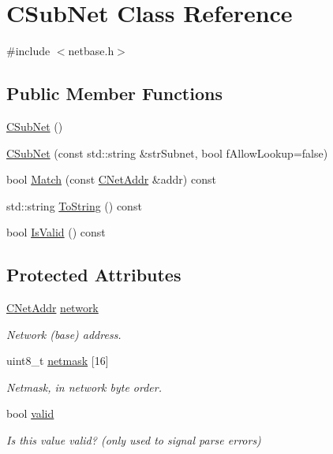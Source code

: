 \hypertarget{class_c_sub_net}{}\section{C\+Sub\+Net Class Reference}
\label{class_c_sub_net}


{\ttfamily \#include $<$netbase.\+h$>$}

\subsection*{Public Member Functions}
\begin{DoxyCompactItemize}
\item 
\hyperlink{class_c_sub_net_ae3a0b1dcca899c93ab7000b51f7f4668}{C\+Sub\+Net} ()
\item 
\hyperlink{class_c_sub_net_a6e8cd7a5e46e93d3ad62896dcb5a5a78}{C\+Sub\+Net} (const std\+::string \&str\+Subnet, bool f\+Allow\+Lookup=false)
\item 
bool \hyperlink{class_c_sub_net_a19156e7aad9c3af4e9728b232eeb3993}{Match} (const \hyperlink{class_c_net_addr}{C\+Net\+Addr} \&addr) const 
\item 
std\+::string \hyperlink{class_c_sub_net_af74e20241c5e2989e94560ab8d4c9fbd}{To\+String} () const 
\item 
bool \hyperlink{class_c_sub_net_afd1697b612d2c833c5a92ceac3d196cf}{Is\+Valid} () const 
\end{DoxyCompactItemize}
\subsection*{Protected Attributes}
\begin{DoxyCompactItemize}
\item 
\hyperlink{class_c_net_addr}{C\+Net\+Addr} \hyperlink{class_c_sub_net_a17c8e899bfed76a371c833fb4cd679c9}{network}
\begin{DoxyCompactList}\small\item\em Network (base) address. \end{DoxyCompactList}\item 
uint8\+\_\+t \hyperlink{class_c_sub_net_a7ba6fc57a4ddcddfa3f3355cc3e56adc}{netmask} \mbox{[}16\mbox{]}
\begin{DoxyCompactList}\small\item\em Netmask, in network byte order. \end{DoxyCompactList}\item 
bool \hyperlink{class_c_sub_net_a01fbc9843041de802baeaf4d6e4bbcc5}{valid}
\begin{DoxyCompactList}\small\item\em Is this value valid? (only used to signal parse errors) \end{DoxyCompactList}\end{DoxyCompactItemize}

